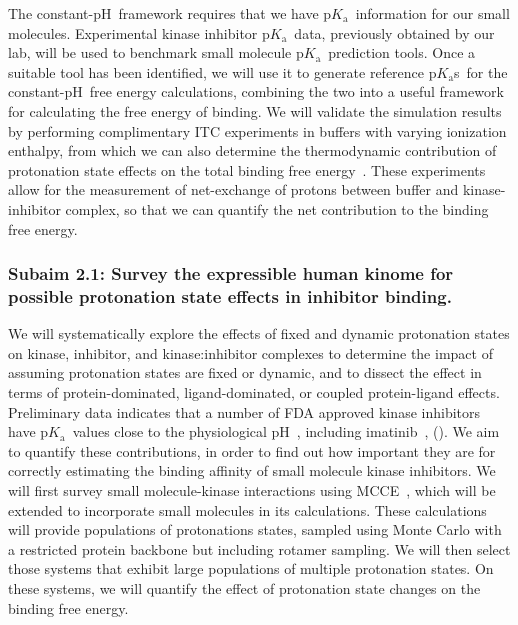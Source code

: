 \documentclass[10pt,final]{article}
\newcommand{\pKa}{p$K_\mathrm{a}$\ }
\newcommand{\pH}{p$\mathrm{H}$\ }
\newcommand{\pKas}{p$K_\mathrm{a}$s\ }
\begin{document}
The constant-\pH framework requires that we have \pKa information for our small molecules. 
%
Experimental kinase inhibitor \pKa data, previously obtained by our lab, will be used to benchmark small molecule \pKa prediction tools.
%
Once a suitable tool has been identified, we will use it to generate reference \pKas for the constant-\pH free energy calculations, combining the two into a useful framework for calculating the free energy of binding.
%
We will validate the simulation results by performing complimentary ITC experiments in buffers with varying ionization enthalpy, from which we can also determine the thermodynamic contribution of protonation state effects on the total binding free energy~\autocite{Baker1996a,Neeb2014a}.
%
These experiments allow for the measurement of net-exchange of protons between buffer and kinase-inhibitor complex, so that we can quantify the net contribution to the binding free energy. 

\subsubsection*{Subaim 2.1: Survey the expressible human kinome for possible protonation state effects in inhibitor binding.}
We will systematically explore the effects of fixed and dynamic protonation states on kinase, inhibitor, and kinase:inhibitor complexes to determine the impact of assuming protonation states are fixed or dynamic, and to dissect the effect in terms of protein-dominated, ligand-dominated, or coupled protein-ligand effects.
%
Preliminary data indicates that a number of FDA approved kinase inhibitors have \pKa values close to the physiological \pH{}, including imatinib~\autocite{Szakacs2005a}, ().
%
We aim to quantify these contributions, in order to find out how important they are for correctly estimating the binding affinity of small molecule kinase inhibitors.
%
We will first survey small molecule-kinase interactions using MCCE~\autocite{Song2009a}, which will be extended to incorporate small molecules in its calculations.
%
These calculations will provide populations of protonations states, sampled using Monte Carlo with a restricted protein backbone but including rotamer sampling.
%
We will then select those systems that exhibit large populations of multiple protonation states.
%
On these systems, we will quantify the effect of protonation state changes on the binding free energy. 
\end{document}
